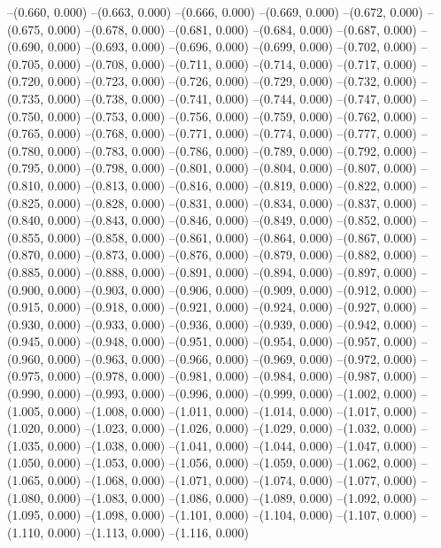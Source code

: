 {--(0.660, 0.000)
--(0.663, 0.000)
--(0.666, 0.000)
--(0.669, 0.000)
--(0.672, 0.000)
--(0.675, 0.000)
--(0.678, 0.000)
--(0.681, 0.000)
--(0.684, 0.000)
--(0.687, 0.000)
--(0.690, 0.000)
--(0.693, 0.000)
--(0.696, 0.000)
--(0.699, 0.000)
--(0.702, 0.000)
--(0.705, 0.000)
--(0.708, 0.000)
--(0.711, 0.000)
--(0.714, 0.000)
--(0.717, 0.000)
--(0.720, 0.000)
--(0.723, 0.000)
--(0.726, 0.000)
--(0.729, 0.000)
--(0.732, 0.000)
--(0.735, 0.000)
--(0.738, 0.000)
--(0.741, 0.000)
--(0.744, 0.000)
--(0.747, 0.000)
--(0.750, 0.000)
--(0.753, 0.000)
--(0.756, 0.000)
--(0.759, 0.000)
--(0.762, 0.000)
--(0.765, 0.000)
--(0.768, 0.000)
--(0.771, 0.000)
--(0.774, 0.000)
--(0.777, 0.000)
--(0.780, 0.000)
--(0.783, 0.000)
--(0.786, 0.000)
--(0.789, 0.000)
--(0.792, 0.000)
--(0.795, 0.000)
--(0.798, 0.000)
--(0.801, 0.000)
--(0.804, 0.000)
--(0.807, 0.000)
--(0.810, 0.000)
--(0.813, 0.000)
--(0.816, 0.000)
--(0.819, 0.000)
--(0.822, 0.000)
--(0.825, 0.000)
--(0.828, 0.000)
--(0.831, 0.000)
--(0.834, 0.000)
--(0.837, 0.000)
--(0.840, 0.000)
--(0.843, 0.000)
--(0.846, 0.000)
--(0.849, 0.000)
--(0.852, 0.000)
--(0.855, 0.000)
--(0.858, 0.000)
--(0.861, 0.000)
--(0.864, 0.000)
--(0.867, 0.000)
--(0.870, 0.000)
--(0.873, 0.000)
--(0.876, 0.000)
--(0.879, 0.000)
--(0.882, 0.000)
--(0.885, 0.000)
--(0.888, 0.000)
--(0.891, 0.000)
--(0.894, 0.000)
--(0.897, 0.000)
--(0.900, 0.000)
--(0.903, 0.000)
--(0.906, 0.000)
--(0.909, 0.000)
--(0.912, 0.000)
--(0.915, 0.000)
--(0.918, 0.000)
--(0.921, 0.000)
--(0.924, 0.000)
--(0.927, 0.000)
--(0.930, 0.000)
--(0.933, 0.000)
--(0.936, 0.000)
--(0.939, 0.000)
--(0.942, 0.000)
--(0.945, 0.000)
--(0.948, 0.000)
--(0.951, 0.000)
--(0.954, 0.000)
--(0.957, 0.000)
--(0.960, 0.000)
--(0.963, 0.000)
--(0.966, 0.000)
--(0.969, 0.000)
--(0.972, 0.000)
--(0.975, 0.000)
--(0.978, 0.000)
--(0.981, 0.000)
--(0.984, 0.000)
--(0.987, 0.000)
--(0.990, 0.000)
--(0.993, 0.000)
--(0.996, 0.000)
--(0.999, 0.000)
--(1.002, 0.000)
--(1.005, 0.000)
--(1.008, 0.000)
--(1.011, 0.000)
--(1.014, 0.000)
--(1.017, 0.000)
--(1.020, 0.000)
--(1.023, 0.000)
--(1.026, 0.000)
--(1.029, 0.000)
--(1.032, 0.000)
--(1.035, 0.000)
--(1.038, 0.000)
--(1.041, 0.000)
--(1.044, 0.000)
--(1.047, 0.000)
--(1.050, 0.000)
--(1.053, 0.000)
--(1.056, 0.000)
--(1.059, 0.000)
--(1.062, 0.000)
--(1.065, 0.000)
--(1.068, 0.000)
--(1.071, 0.000)
--(1.074, 0.000)
--(1.077, 0.000)
--(1.080, 0.000)
--(1.083, 0.000)
--(1.086, 0.000)
--(1.089, 0.000)
--(1.092, 0.000)
--(1.095, 0.000)
--(1.098, 0.000)
--(1.101, 0.000)
--(1.104, 0.000)
--(1.107, 0.000)
--(1.110, 0.000)
--(1.113, 0.000)
--(1.116, 0.000)
}
